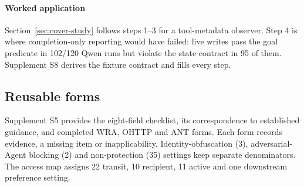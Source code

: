 \paragraph{Worked application}
Section~\ref{sec:cover-study} follows steps 1--3 for a tool-metadata observer. Step 4 is where completion-only reporting would have failed: live writes pass the goal predicate in 102/120 Qwen runs but violate the state contract in 95 of them. Supplement S8 derives the fixture contract and fills every step.

\subsection{Reusable forms}
Supplement S5 provides the eight-field checklist, its correspondence to established guidance, and completed WRA, OHTTP and ANT forms. Each form records evidence, a missing item or inapplicability. Identity-obfuscation (3), adversarial-Agent blocking (2) and non-protection (35) settings keep separate denominators. The access map assigns 22 transit, 10 recipient, 11 active and one downstream preference setting.
